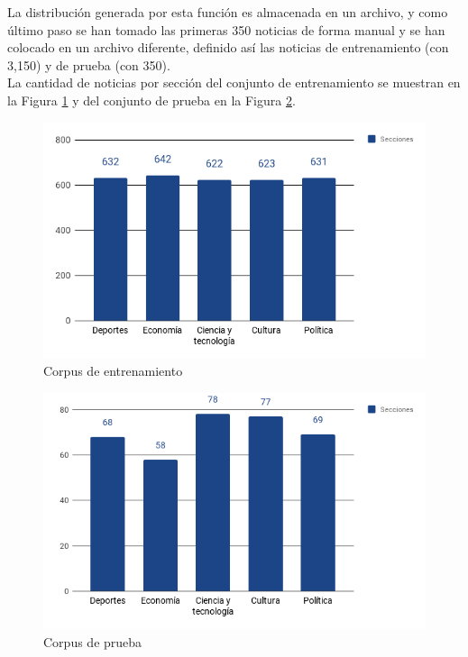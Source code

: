 La distribución generada por esta función es almacenada en un archivo, y como último paso se han tomado las primeras 350 noticias de forma manual y se han colocado en un archivo diferente, definido así las noticias de entrenamiento (con 3,150) y de prueba (con 350).\\

La cantidad de noticias por sección del conjunto de entrenamiento se muestran en la Figura \ref{fig:cp5:seccionE} y del conjunto de prueba en la Figura \ref{fig:cp5:seccionP}.



\begin{figure}[H]
\centering
\includegraphics[scale=.6]{imagenes/capitulo5/Entrenamiento/SeccionesE.png}
\caption{Corpus de entrenamiento}
\label{fig:cp5:seccionE}
\end{figure}

\begin{figure}[H]
\centering
\includegraphics[scale=.6]{imagenes/capitulo5/Entrenamiento/SeccionesP.png}
\caption{Corpus de prueba}
\label{fig:cp5:seccionP}
\end{figure}

